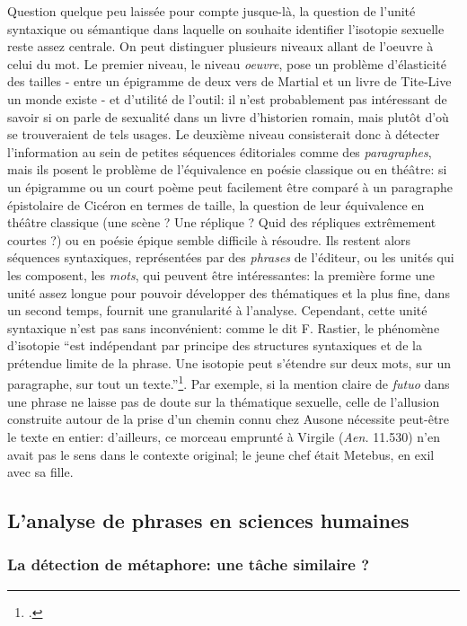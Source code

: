 Question quelque peu laissée pour compte jusque-là, la question de l'unité syntaxique ou sémantique dans laquelle on souhaite identifier l'isotopie sexuelle reste assez centrale. On peut distinguer plusieurs niveaux allant de l'oeuvre à celui du mot. Le premier niveau, le niveau \textit{oeuvre}, pose un problème d'élasticité des tailles - entre un épigramme de deux vers de Martial et un livre de Tite-Live un monde existe - et d'utilité de l'outil: il n'est probablement pas intéressant de savoir si on parle de sexualité dans un livre d'historien romain, mais plutôt d'où se trouveraient de tels usages. Le deuxième niveau consisterait donc à détecter l'information au sein de petites séquences éditoriales comme des  \textit{paragraphes}, mais ils posent le problème de l'équivalence en poésie classique ou en théâtre: si un épigramme ou un court poème peut facilement être comparé à un paragraphe épistolaire de Cicéron en termes de taille, la question de leur équivalence en théâtre classique (une scène ? Une réplique ? Quid des répliques extrêmement courtes ?) ou en poésie épique semble difficile à résoudre. Ils restent alors séquences syntaxiques, représentées par des \textit{phrases} de l'éditeur, ou les unités qui les composent, les \textit{mots}, qui peuvent être intéressantes: la première forme une unité assez longue pour pouvoir développer des thématiques et la plus fine, dans un second temps, fournit une granularité à l'analyse. Cependant, cette unité syntaxique n'est pas sans inconvénient: comme le dit F. Rastier, le phénomène d'isotopie \enquote{est indépendant par principe des structures syntaxiques et de la prétendue limite de la phrase. Une isotopie peut s'étendre sur deux mots, sur un paragraphe, sur tout un texte.}\footcite[p. 34]{rastier_isotopie_1985}. Par exemple, si la mention claire de \textit{futuo} dans une phrase ne laisse pas de doute sur la thématique sexuelle, celle de l'allusion construite autour de la prise d'un chemin connu chez Ausone nécessite peut-être le texte en entier: d'ailleurs, ce morceau emprunté à Virgile (\textit{Aen.} 11.530) n'en avait pas le sens dans le contexte original; le jeune chef était Metebus, en exil avec sa fille. 

\subsection{L'analyse de phrases en sciences humaines}

\subsubsection{La détection de métaphore: une tâche similaire ?}

